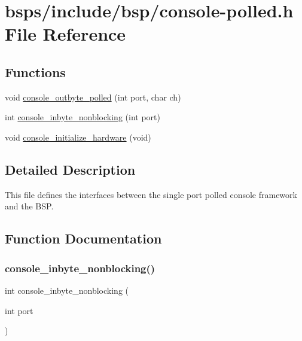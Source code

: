\hypertarget{console-polled_8h}{}\section{bsps/include/bsp/console-\/polled.h File Reference}
\label{console-polled_8h}
\subsection*{Functions}
\begin{DoxyCompactItemize}
\item 
void \mbox{\hyperlink{console-polled_8h_ac9a2a930ad64626626190f49c68bc312}{console\+\_\+outbyte\+\_\+polled}} (int port, char ch)
\item 
int \mbox{\hyperlink{console-polled_8h_a33017a80c39bdce884e201734ceb023d}{console\+\_\+inbyte\+\_\+nonblocking}} (int port)
\item 
void \mbox{\hyperlink{console-polled_8h_ab1d663fbefeeda4fccd02f9d1bfb4285}{console\+\_\+initialize\+\_\+hardware}} (void)
\end{DoxyCompactItemize}


\subsection{Detailed Description}
This file defines the interfaces between the single port polled console framework and the B\+SP. 

\subsection{Function Documentation}
\mbox{\label{console-polled_8h_a33017a80c39bdce884e201734ceb023d}} 
\subsubsection{\texorpdfstring{console\_inbyte\_nonblocking()}{console\_inbyte\_nonblocking()}}
{\footnotesize\ttfamily int console\+\_\+inbyte\+\_\+nonblocking (\begin{DoxyParamCaption}\item[{int}]{port }\end{DoxyParamCaption})}

